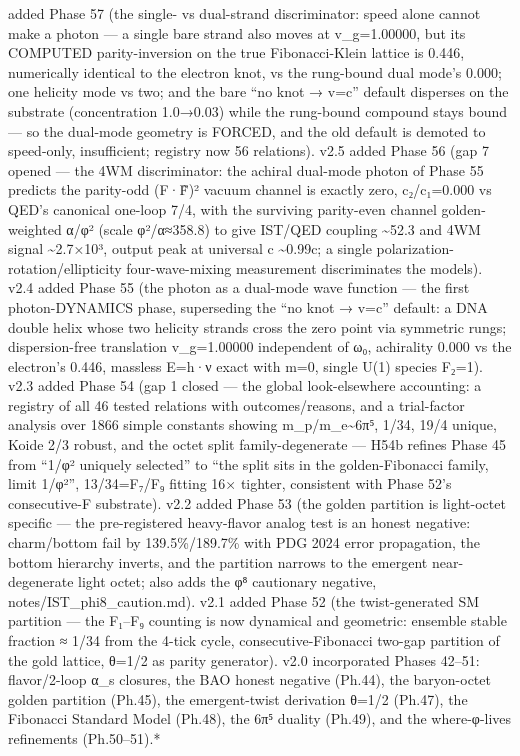 \documentclass[
]{article}
\begin{document}
added Phase 57 (the single- vs dual-strand discriminator: speed alone
cannot make a photon --- a single bare strand also moves at
v\_g=1.00000, but its COMPUTED parity-inversion on the true
Fibonacci-Klein lattice is 0.446, numerically identical to the electron
knot, vs the rung-bound dual mode's 0.000; one helicity mode vs two; and
the bare ``no knot → v=c'' default disperses on the substrate
(concentration 1.0→0.03) while the rung-bound compound stays bound ---
so the dual-mode geometry is FORCED, and the old default is demoted to
speed-only, insufficient; registry now 56 relations). v2.5 added Phase
56 (gap 7 opened --- the 4WM discriminator: the achiral dual-mode photon
of Phase 55 predicts the parity-odd (F·F̃)² vacuum channel is exactly
zero, c₂/c₁=0.000 vs QED's canonical one-loop 7/4, with the surviving
parity-even channel golden-weighted α/φ² (scale φ²/α≈358.8) to give
IST/QED coupling \textasciitilde52.3 and 4WM signal
\textasciitilde2.7×10³, output peak at universal c \textasciitilde0.99c;
a single polarization-rotation/ellipticity four-wave-mixing measurement
discriminates the models). v2.4 added Phase 55 (the photon as a
dual-mode wave function --- the first photon-DYNAMICS phase, superseding
the ``no knot → v=c'' default: a DNA double helix whose two helicity
strands cross the zero point via symmetric rungs; dispersion-free
translation v\_g=1.00000 independent of ω₀, achirality 0.000 vs the
electron's 0.446, massless E=h·ν exact with m=0, single U(1) species
F₂=1). v2.3 added Phase 54 (gap 1 closed --- the global look-elsewhere
accounting: a registry of all 46 tested relations with outcomes/reasons,
and a trial-factor analysis over 1866 simple constants showing
m\_p/m\_e\textasciitilde6π⁵, 1/34, 19/4 unique, Koide 2/3 robust, and
the octet split family-degenerate --- H54b refines Phase 45 from ``1/φ²
uniquely selected'' to ``the split sits in the golden-Fibonacci family,
limit 1/φ²'', 13/34=F₇/F₉ fitting 16× tighter, consistent with Phase
52's consecutive-F substrate). v2.2 added Phase 53 (the golden partition
is light-octet specific --- the pre-registered heavy-flavor analog test
is an honest negative: charm/bottom fail by 139.5\%/189.7\% with PDG
2024 error propagation, the bottom hierarchy inverts, and the partition
narrows to the emergent near-degenerate light octet; also adds the φ⁸
cautionary negative, notes/IST\_phi8\_caution.md). v2.1 added Phase 52
(the twist-generated SM partition --- the F₁--F₉ counting is now
dynamical and geometric: ensemble stable fraction ≈ 1/34 from the 4-tick
cycle, consecutive-Fibonacci two-gap partition of the gold lattice,
θ=1/2 as parity generator). v2.0 incorporated Phases 42--51:
flavor/2-loop α\_s closures, the BAO honest negative (Ph.44), the
baryon-octet golden partition (Ph.45), the emergent-twist derivation
θ=1/2 (Ph.47), the Fibonacci Standard Model (Ph.48), the 6π⁵ duality
(Ph.49), and the where-φ-lives refinements (Ph.50--51).*
\end{document}
